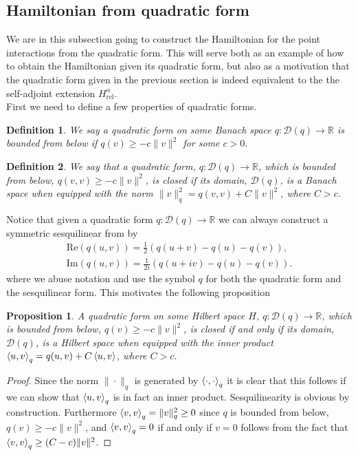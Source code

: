 \documentclass[a4paper,11pt]{article}
\newcommand{\Real}{\text{Re}}
\newcommand{\Imag}{\text{Im}}
\newcommand{\dom}[1]{\mathscr D\left(#1\right)}
\newcommand{\R}{\mathbb{R}}
\newtheorem{definition}{Definition}
\newtheorem{proposition}{Proposition}
\numberwithin{equation}{section}
\begin{document}
\subsection{Hamiltonian from quadratic form}
We are in this subsection going to construct the Hamiltonian for the point interactions from the quadratic form. This will serve both as an example of how to obtain the Hamiltonian given its quadratic form, but also as a motivation that the quadratic form given in the previous section is indeed equivalent to the the self-adjoint extension $ H_{\text{rel}}^\alpha $.\\
First we need to define a few properties of quadratic forms.\begin{definition}
	We say a quadratic form on some Banach space $ q: \dom{q}\to\R $ is bounded from below if $ q(v)\geq-c\|v\|^2 $ for some $ c>0 $. 
\end{definition}
\begin{definition}
	We say that a quadratic form, $ q:\dom{q}\to\R $, which is bounded from below, $ q(v,v)\geq-c\|v\|^2 $, is closed if its domain, $ \dom{q} $, is a Banach space when equipped with the norm $ \|v\|^2_q=q(v,v)+C\|v\|^2 $, where $ C>c $.
\end{definition}
Notice that given a quadratic form $ q:\dom{q}\to\R $ we can always construct a symmetric sesquilinear from by \begin{equation}
\begin{aligned}
\Real (q(u,v))=\frac{1}{2}(q(u+v)-q(u)-q(v)),\\ \Imag(q(u,v))=\frac{1}{2i}(q(u+iv)-q(u)-q(v)).
\end{aligned}
\end{equation}
where we abuse notation and use the symbol $ q $ for both the quadratic form and the sesquilinear form.
This motivates the following proposition \begin{proposition}
	A quadratic form on some Hilbert space $ H $, $ q:\dom{q}\to\R $, which is bounded from below, $ q(v)\geq-c\|v\|^2 $, is closed if and only if its domain, $ \dom{q} $, is a Hilbert space when equipped with the inner product $ \braket{u,v}_q=q(u,v)+C\braket{u,v} $, where $ C>c $.
\end{proposition}
\begin{proof}
	Since the norm $ \|\cdot\|_q$ is generated by $ \braket{\cdot,\cdot}_q $ it is clear that this follows if we can show that $ \braket{u,v}_q $ is in fact an inner product. Sesquilinearity is obvious by construction. Furthermore $ \braket{v,v}_q=\|v\|_q^2\geq0 $ since $ q $ is bounded from below, $ q(v)\geq-c\|v\|^2 $, and $ \braket{v,v}_q=0 $ if and only if $ v=0 $ follows from the fact that $ \braket{v,v}_q\geq(C-c)\|v\|^2 $.
\end{proof}
\end{document}
